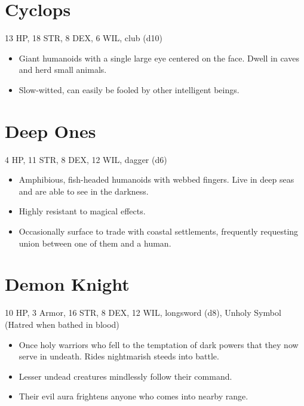 \documentclass[
  10pt,
  american,
]{article}
\begin{document}
\hypertarget{cyclops}{%
\section{Cyclops}\label{cyclops}}

13 HP, 18 STR, 8 DEX, 6 WIL, club (d10)

\begin{samepage}
\begin{itemize}
\setlength\itemsep{-.5em}
\item Giant humanoids with a single large eye centered on the face.   Dwell in caves and herd small animals.
\item Slow-witted, can easily be fooled by other intelligent beings.
\end{itemize}
\end{samepage}

\hypertarget{deep-ones}{%
\section{Deep Ones}\label{deep-ones}}

4 HP, 11 STR, 8 DEX, 12 WIL, dagger (d6)

\begin{samepage}
\begin{itemize}
\setlength\itemsep{-.5em}
\item Amphibious, fish-headed humanoids with webbed fingers.   Live in deep seas and are able to see in the darkness.
\item Highly resistant to magical effects.
\item Occasionally surface to trade with coastal settlements, frequently requesting union between one of them and a human.
\end{itemize}
\end{samepage}

\hypertarget{demon-knight}{%
\section{Demon Knight}\label{demon-knight}}

10 HP, 3 Armor, 16 STR, 8 DEX, 12 WIL, longsword (d8), Unholy Symbol
(Hatred when bathed in blood)

\begin{samepage}
\begin{itemize}
\setlength\itemsep{-.5em}
\item Once holy warriors who fell to the temptation of dark powers that they now serve in undeath.   Rides nightmarish steeds into battle.
\item Lesser undead creatures mindlessly follow their command.
\item Their evil aura frightens anyone who comes into nearby range.
\end{itemize}
\end{samepage}
\end{document}
